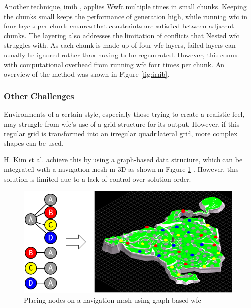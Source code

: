 Another technique, \acrlong{imib} \cite{Infinite_Modifying_In_Blocks}, applies W\acrshort{wfc} multiple times in small chunks. Keeping the chunks small keeps the performance of generation high, while running \acrshort{wfc} in four layers per chunk ensures that constraints are satisfied between adjacent chunks. The layering also addresses the limitation of conflicts that Nested \acrshort{wfc} struggles with. As each chunk is made up of four \acrshort{wfc} layers, failed layers can usually be ignored rather than having to be regenerated. However, this comes with computational overhead from running \acrshort{wfc} four times per chunk. An overview of the method was shown in Figure \ref{fig:imib}.

\subsubsection{Other Challenges}
Environments of a certain style, especially those trying to create a realistic feel, may struggle from \acrshort{wfc}'s use of a grid structure for its output. However, if this regular grid is transformed into an irregular quadrilateral grid, more complex shapes can be used.

H. Kim et al. achieve this by using a graph-based data structure, which can be integrated with a navigation mesh in 3D as shown in Figure \ref{fig:navigationMeshNodePlacement} \cite{WFC_Graph-based}. However, this solution is limited due to a lack of control over solution order.

\begin{figure}[H]
    \centering
    \includegraphics[width=\textwidth, height=0.3\textheight, keepaspectratio]{Images/NavigationMeshNodePlacement.png}
    \caption{Placing nodes on a navigation mesh using graph-based \acrshort{wfc} \cite{WFC_Graph-based}}
    \label{fig:navigationMeshNodePlacement}
\end{figure}

